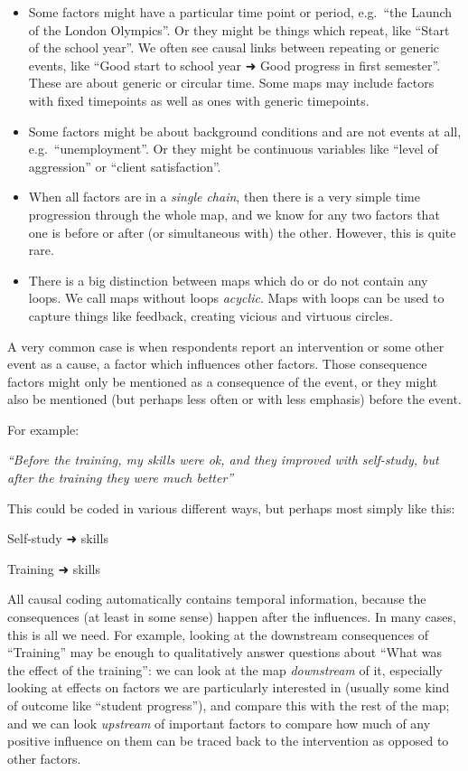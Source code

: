 \documentclass[
]{book}
\begin{document}
\begin{itemize}
\item
  Some factors might have a particular time point or period, e.g.~``the Launch of the London Olympics''. Or they might be things which repeat, like ``Start of the school year''. We often see causal links between repeating or generic events, like ``Good start to school year ➜ Good progress in first semester''. These are about generic or circular time. Some maps may include factors with fixed timepoints as well as ones with generic timepoints.
\item
  Some factors might be about background conditions and are not events at all, e.g.~``unemployment''. Or they might be continuous variables like ``level of aggression'' or ``client satisfaction''.
\item
  When all factors are in a \emph{single chain}, then there is a very simple time progression through the whole map, and we know for any two factors that one is before or after (or simultaneous with) the other. However, this is quite rare.
\item
  There is a big distinction between maps which do or do not contain any loops. We call maps without loops \emph{acyclic}. Maps with loops can be used to capture things like feedback, creating vicious and virtuous circles.
\end{itemize}

A very common case is when respondents report an intervention or some other event as a cause, a factor which influences other factors. Those consequence factors might only be mentioned as a consequence of the event, or they might also be mentioned (but perhaps less often or with less emphasis) before the event.

For example:

\emph{``Before the training, my skills were ok, and they improved with self-study, but after the training they were much better''}

This could be coded in various different ways, but perhaps most simply like this:

Self-study ➜ skills

Training ➜ skills

All causal coding automatically contains temporal information, because the consequences (at least in some sense) happen after the influences. In many cases, this is all we need. For example, looking at the downstream consequences of ``Training'' may be enough to qualitatively answer questions about ``What was the effect of the training'': we can look at the map \emph{downstream} of it, especially looking at effects on factors we are particularly interested in (usually some kind of outcome like ``student progress''), and compare this with the rest of the map; and we can look \emph{upstream} of important factors to compare how much of any positive influence on them can be traced back to the intervention as opposed to other factors.
\end{document}
